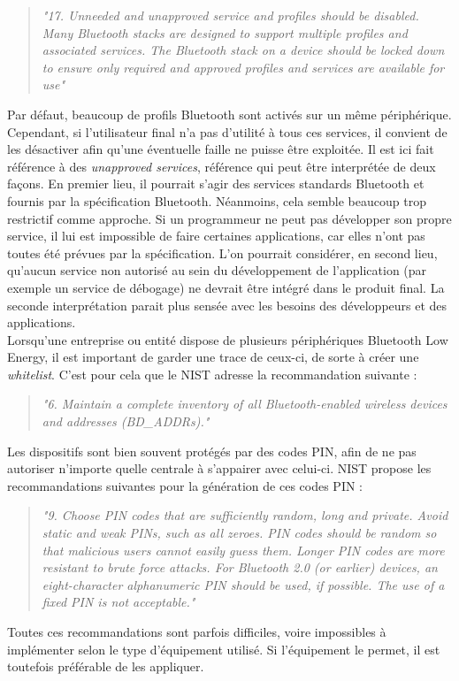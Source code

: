 \begin{quote}
\begin{center}
    \textit{"17. Unneeded and unapproved service and profiles should be disabled. Many Bluetooth stacks are designed to support multiple profiles and associated services. The Bluetooth stack on a device should be locked down to ensure only required and approved profiles and services are available for use"}
\end{center}
\end{quote}

Par défaut, beaucoup de profils Bluetooth sont activés sur un même périphérique. Cependant, si l'utilisateur final n'a pas d'utilité à tous ces services, il convient de les désactiver afin qu'une éventuelle faille ne puisse être exploitée. Il est ici fait référence à des \textit{unapproved services}, référence qui peut être interprétée de deux façons. En premier lieu, il pourrait s'agir des services standards Bluetooth et fournis par la spécification Bluetooth. Néanmoins, cela semble beaucoup trop restrictif comme approche. Si un programmeur ne peut pas développer son propre service, il lui est impossible de faire certaines applications, car elles n'ont pas toutes été prévues par la spécification. L'on pourrait considérer, en second lieu, qu'aucun service non autorisé au sein du développement de l'application (par exemple un service de débogage) ne devrait être intégré dans le produit final. La seconde interprétation parait plus sensée avec les besoins des développeurs et des applications.\\

Lorsqu'une entreprise ou entité dispose de plusieurs périphériques Bluetooth Low Energy, il est important de garder une trace de ceux-ci, de sorte à créer une \textit{whitelist}. C'est pour cela que le NIST adresse la recommandation suivante :

 \begin{quote}
\begin{center}
    \textit{"6. Maintain a complete inventory of all Bluetooth-enabled wireless devices and addresses (BD\_ADDRs)."}
\end{center}
\end{quote}


Les dispositifs sont bien souvent protégés par des codes PIN, afin de ne pas autoriser n'importe quelle centrale à s'appairer avec celui-ci. NIST propose les recommandations suivantes pour la génération de ces codes PIN :
\begin{quote}
\begin{center}
    \textit{"9. Choose PIN codes that are sufficiently random, long and private. Avoid static and weak PINs, such as all zeroes. PIN codes should be random so that malicious users cannot easily guess them. Longer PIN codes are more resistant to brute force attacks. For Bluetooth 2.0 (or earlier) devices, an eight-character alphanumeric PIN should be used, if possible. The use of a fixed PIN is not acceptable."}
\end{center}
\end{quote}

Toutes ces recommandations sont parfois difficiles, voire impossibles à implémenter selon le type d'équipement utilisé. Si l'équipement le permet, il est toutefois préférable de les appliquer.

